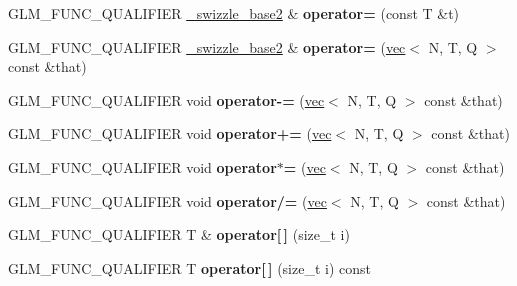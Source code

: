 \begin{DoxyCompactItemize}
\item 
\mbox{\label{structglm_1_1detail_1_1__swizzle__base2_a48c3cc524e3e408243a1ee4ef42cd90c}} 
G\+L\+M\+\_\+\+F\+U\+N\+C\+\_\+\+Q\+U\+A\+L\+I\+F\+I\+ER \hyperlink{structglm_1_1detail_1_1__swizzle__base2}{\+\_\+swizzle\+\_\+base2} \& {\bfseries operator=} (const T \&t)
\item 
\mbox{\label{structglm_1_1detail_1_1__swizzle__base2_a70f9bb1c990a71a55d125abc36c6849b}} 
G\+L\+M\+\_\+\+F\+U\+N\+C\+\_\+\+Q\+U\+A\+L\+I\+F\+I\+ER \hyperlink{structglm_1_1detail_1_1__swizzle__base2}{\+\_\+swizzle\+\_\+base2} \& {\bfseries operator=} (\hyperlink{structglm_1_1vec}{vec}$<$ N, T, Q $>$ const \&that)
\item 
\mbox{\label{structglm_1_1detail_1_1__swizzle__base2_a5e985ec8cbfa38395aa667eea74d2ca0}} 
G\+L\+M\+\_\+\+F\+U\+N\+C\+\_\+\+Q\+U\+A\+L\+I\+F\+I\+ER void {\bfseries operator-\/=} (\hyperlink{structglm_1_1vec}{vec}$<$ N, T, Q $>$ const \&that)
\item 
\mbox{\label{structglm_1_1detail_1_1__swizzle__base2_a4c22bf1dde634b274789b630f75af0f1}} 
G\+L\+M\+\_\+\+F\+U\+N\+C\+\_\+\+Q\+U\+A\+L\+I\+F\+I\+ER void {\bfseries operator+=} (\hyperlink{structglm_1_1vec}{vec}$<$ N, T, Q $>$ const \&that)
\item 
\mbox{\label{structglm_1_1detail_1_1__swizzle__base2_a41a9fe45545f5adcd0c529c3a426e29f}} 
G\+L\+M\+\_\+\+F\+U\+N\+C\+\_\+\+Q\+U\+A\+L\+I\+F\+I\+ER void {\bfseries operator$\ast$=} (\hyperlink{structglm_1_1vec}{vec}$<$ N, T, Q $>$ const \&that)
\item 
\mbox{\label{structglm_1_1detail_1_1__swizzle__base2_ad4ef23a8bcf9b2474f08c5f1960e3fbd}} 
G\+L\+M\+\_\+\+F\+U\+N\+C\+\_\+\+Q\+U\+A\+L\+I\+F\+I\+ER void {\bfseries operator/=} (\hyperlink{structglm_1_1vec}{vec}$<$ N, T, Q $>$ const \&that)
\item 
\mbox{\label{structglm_1_1detail_1_1__swizzle__base2_a9a31c29fd5419a40ef6ae9dbbbb3887e}} 
G\+L\+M\+\_\+\+F\+U\+N\+C\+\_\+\+Q\+U\+A\+L\+I\+F\+I\+ER T \& {\bfseries operator\mbox{[}$\,$\mbox{]}} (size\+\_\+t i)
\item 
\mbox{\label{structglm_1_1detail_1_1__swizzle__base2_a0e341ddb30329eabeac3361833e45cd0}} 
G\+L\+M\+\_\+\+F\+U\+N\+C\+\_\+\+Q\+U\+A\+L\+I\+F\+I\+ER T {\bfseries operator\mbox{[}$\,$\mbox{]}} (size\+\_\+t i) const
\end{DoxyCompactItemize}
